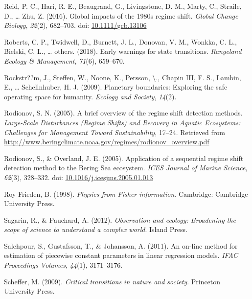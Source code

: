 \documentclass[12pt,twoside,openany]{reedthesis}
\begin{document}
\leavevmode\hypertarget{ref-reid_global_2016}{}%
Reid, P. C., Hari, R. E., Beaugrand, G., Livingstone, D. M., Marty, C., Straile, D., \ldots{} Zhu, Z. (2016). Global impacts of the 1980s regime shift. \emph{Global Change Biology}, \emph{22}(2), 682--703. doi: \href{https://doi.org/10.1111/gcb.13106}{10.1111/gcb.13106}

\leavevmode\hypertarget{ref-roberts2018early}{}%
Roberts, C. P., Twidwell, D., Burnett, J. L., Donovan, V. M., Wonkka, C. L., Bielski, C. L., \ldots{} others. (2018). Early warnings for state transitions. \emph{Rangeland Ecology \& Management}, \emph{71}(6), 659--670.

\leavevmode\hypertarget{ref-rockstrom_planetary_2009}{}%
Rockstr??m, J., Steffen, W., Noone, K., Persson, \textbackslash., Chapin III, F. S., Lambin, E., \ldots{} Schellnhuber, H. J. (2009). Planetary boundaries: Exploring the safe operating space for humanity. \emph{Ecology and Society}, \emph{14}(2).

\leavevmode\hypertarget{ref-rodionov_brief_2005}{}%
Rodionov, S. N. (2005). A brief overview of the regime shift detection methods. \emph{Large-Scale Disturbances (Regime Shifts) and Recovery in Aquatic Ecosystems: Challenges for Management Toward Sustainability}, 17--24. Retrieved from \url{http://www.beringclimate.noaa.gov/regimes/rodionov_overview.pdf}

\leavevmode\hypertarget{ref-rodionov_application_2005}{}%
Rodionov, S., \& Overland, J. E. (2005). Application of a sequential regime shift detection method to the Bering Sea ecosystem. \emph{ICES Journal of Marine Science}, \emph{62}(3), 328--332. doi: \href{https://doi.org/10.1016/j.icesjms.2005.01.013}{10.1016/j.icesjms.2005.01.013}

\leavevmode\hypertarget{ref-frieden_physics_1998}{}%
Roy Frieden, B. (1998). \emph{Physics from Fisher information}. Cambridge: Cambridge University Press.

\leavevmode\hypertarget{ref-sagarin_observation_2012}{}%
Sagarin, R., \& Pauchard, A. (2012). \emph{Observation and ecology: Broadening the scope of science to understand a complex world}. Island Press.

\leavevmode\hypertarget{ref-salehpour2011line}{}%
Salehpour, S., Gustafsson, T., \& Johansson, A. (2011). An on-line method for estimation of piecewise constant parameters in linear regression models. \emph{IFAC Proceedings Volumes}, \emph{44}(1), 3171--3176.

\leavevmode\hypertarget{ref-scheffer_critical_2009}{}%
Scheffer, M. (2009). \emph{Critical transitions in nature and society}. Princeton University Press.
\end{document}
